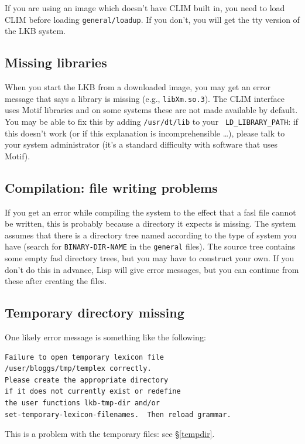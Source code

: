 \documentclass[12pt]{report}
\newcommand{\filename}[1]{{\tt #1}}
\begin{document}
If you are using an image which doesn't have CLIM built in, you need to load
CLIM before loading \filename{general/loadup}.  If you don't, you will get the
tty version of the LKB system.

\subsection{Missing libraries}

When you start the LKB from a downloaded image, you may get an error message that
says a library is missing (e.g., \filename{libXm.so.3}).  The CLIM interface uses
Motif libraries and on some systems these are not made available by default.
You may be able to fix this by adding \filename{/usr/dt/lib} to your {\tt
LD\_LIBRARY\_PATH}: if this doesn't work (or if this explanation is
incomprehensible \ldots), please talk to your system administrator (it's a
standard difficulty with software that uses Motif).

\subsection{Compilation: file writing problems}

If you get an error while compiling the system to the effect that
a fasl file cannot be written, this is probably because a directory it
expects is missing.
The system assumes that there
is a directory tree named according to the type of system you have
(search for {\tt BINARY-DIR-NAME} in the \filename{general} files).
The source tree contains some empty fasl directory trees, but you
may have to construct your own.
If you don't do this in advance, Lisp will give error messages, but
you can continue from these after creating the files.


\subsection{Temporary directory missing}

One likely error message is something like the following:
\begin{verbatim}
Failure to open temporary lexicon file 
/user/bloggs/tmp/templex correctly.
Please create the appropriate directory 
if it does not currently exist or redefine
the user functions lkb-tmp-dir and/or
set-temporary-lexicon-filenames.  Then reload grammar.
\end{verbatim}
This is a problem with the temporary files: see \S\ref{tempdir}.
\end{document}

